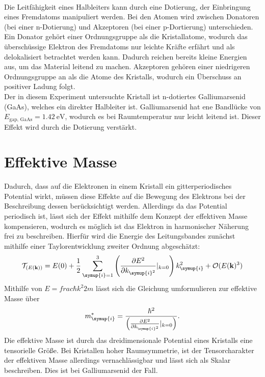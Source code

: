 \\Die Leitfähigkeit eines Halbleiters kann durch eine Dotierung, der Einbringung eines Fremdatoms manipuliert werden. Bei den Atomen wird zwischen Donatoren (bei einer n-Dotierung) und
Akzeptoren (bei einer p-Dortierung) unterschieden.\\
Ein Donator gehört einer Ordnungsgruppe als die Kristallatome, wodurch das überschüssige Elektron des Fremdatoms nur leichte Kräfte 
erfährt und als delokalisiert betrachtet werden kann. Dadurch reichen bereits kleine Energien aus, um das Material leitend zu machen.
Akzeptoren gehören einer niedrigeren Ordnungsgruppe an als die Atome des Kristalls, wodurch ein Überschuss an positiver Ladung folgt.\\
Der in diesem Experiment untersuchte Kristall ist n-dotiertes Galliumarsenid (GaAs), welches ein direkter Halbleiter ist. Galliumarsenid hat ene Bandlücke von $E_{\text{gap, GaAs}} = \qty{1,42}{\electronvolt}$,
wodurch es bei Raumtemperatur nur leicht leitend ist. Dieser Effekt wird durch die Dotierung verstärkt.

\section{Effektive Masse}
Dadurch, dass auf die Elektronen in einem Kristall ein gitterperiodisches Potential wirkt, müssen diese Effekte auf die Bewegung des Elektrons bei der Beschreibung
dessen berücksichtigt werden. Allerdings da das Potential periodisch ist, lässt sich der Effekt mithilfe dem Konzept der effektiven Masse kompensieren, wodurch es möglich ist
das Elektron in harmonischer Näherung frei zu beschreiben. Hierfür wird die Energie des Leitungsbandes zunächst mithilfe einer Taylorentwicklung zweiter Ordnung abgeschätzt:
\begin{equation*}
    \mathcal{T}_{(E(\mathbf{k}))} = E(0) + \frac{1}{2}\sum_{\symup{i}=1}^{3}\left(\frac{\partial E^2}{\partial k_{\symup{i}^2}}|_{k=0}\right) k_{\symup{i}}^2 + \mathcal{O}(E(\mathbf{k})^3)
\end{equation*}
Mithilfe von $E=frac{\hbar k^2}{2m}$ lässt sich die Gleichung umformulieren zur effektive Masse über
\begin{equation*}
    m_{\symup{i}}^{*}=\frac{\hbar^2}{\left(\frac{\partial E^2}{\partial k_{\symup{i}^2}}|_{k=0}\right)}.
\end{equation*}
Die effektive Masse ist durch das dreidimensionale Potential eines Kristalls eine tensorielle Größe. Bei Kristallen hoher Raumsymmetrie, ist der Tensorcharakter der effektiven Masse
allerdings vernachlässigbar und lässt sich als Skalar beschreiben. Dies ist bei Galliumarsenid der Fall.

